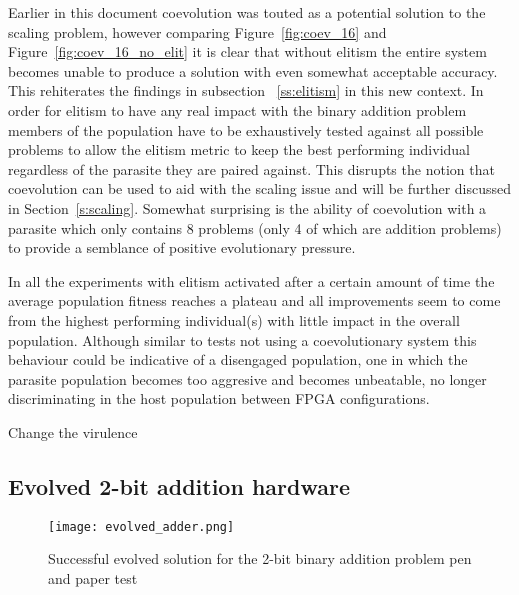 Earlier in this document coevolution was touted as a potential solution to the scaling
problem, however comparing Figure~\ref{fig:coev_16} and Figure~\ref{fig:coev_16_no_elit}
it is clear that without elitism the entire system becomes unable to produce a solution
with even somewhat acceptable accuracy. This rehiterates the findings in subsection
~\ref{ss:elitism} in this new context. In order for elitism to have any real impact
with the binary addition problem members of the population have to be exhaustively tested
against all possible problems to allow the elitism metric to keep the best performing
individual regardless of the parasite they are paired against. This disrupts the
notion that coevolution can be used to aid with the scaling issue and will be further
discussed in Section~\ref{s:scaling}. Somewhat surprising is the ability of coevolution
with a parasite which only contains 8 problems (only 4 of which are addition problems)
to provide a semblance of positive evolutionary pressure.

In all the experiments with elitism activated after
a certain amount of time the average population
fitness reaches a plateau and all improvements seem to come from the highest performing
individual(s) with little impact in the overall population. Although similar to
tests not using a coevolutionary system this behaviour could be indicative
of a disengaged population, one in which the parasite population becomes too aggresive
and becomes unbeatable, no longer discriminating in the host population between FPGA
configurations.

\todo Change the virulence

\subsection{Evolved 2-bit addition hardware}

\begin{figure}
	\centering
	\texttt{[image: evolved\_adder.png]}
	\caption{Successful evolved solution for the 2-bit binary addition problem
	\todo pen and paper test}
	\label{fig:2-bit}
\end{figure}

